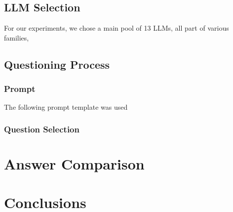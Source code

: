 \documentclass[11pt]{article}
\begin{document}
\subsection{LLM Selection}
For our experiments, we chose a main pool of 13 LLMs, all part of various families, 

\subsection{Questioning Process}

\subsubsection{Prompt}
The following prompt template was used

\subsubsection{Question Selection}



\section{Answer Comparison}



\section{Conclusions}





\end{document}
